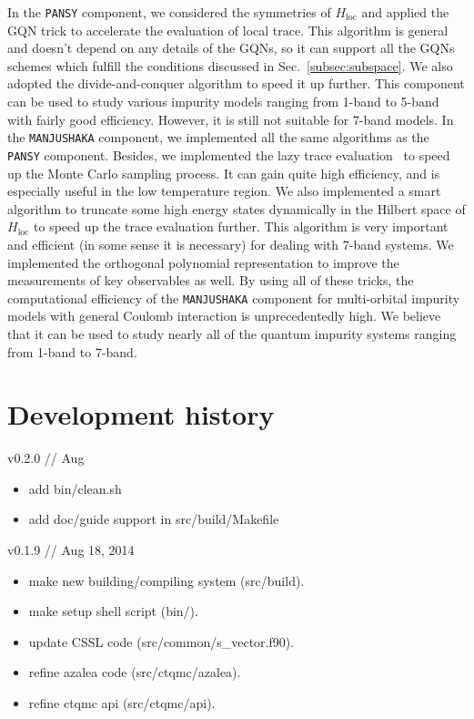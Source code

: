 In the \texttt{PANSY} component, we considered the symmetries of $H_{\text{loc}}$ and applied the GQN trick to accelerate the evaluation of local trace. This algorithm is general and doesn't depend on any details of the GQNs, so it can support all the GQNs schemes which fulfill the conditions discussed in Sec.~\ref{subsec:subspace}. We also adopted the divide-and-conquer algorithm to speed it up further. This component can be used to study various impurity models ranging from 1-band to 5-band with fairly good efficiency. However, it is still not suitable for 7-band models. In the \texttt{MANJUSHAKA} component, we implemented all the same algorithms as the \texttt{PANSY} component. Besides, we implemented the lazy trace evaluation~\cite{arXiv:1403.7214} to speed up the Monte Carlo sampling process. It can gain quite high efficiency, and is especially useful in the low temperature region. We also implemented a smart algorithm to truncate some high energy states dynamically in the Hilbert space of $H_{\text{loc}}$ to speed up the trace evaluation further. This algorithm is very important and efficient (in some sense it is necessary) for dealing with 7-band systems. We implemented the orthogonal polynomial representation to improve the measurements of key observables as well. By using all of these tricks, the computational efficiency of the \texttt{MANJUSHAKA} component for multi-orbital impurity models with general Coulomb interaction is unprecedentedly high. We believe that it can be used to study nearly all of the quantum impurity systems ranging from 1-band to 7-band.

\section{Development history}

v0.2.0 // Aug

\begin{itemize}
\item add bin/clean.sh
\item add doc/guide support in src/build/Makefile
\end{itemize}

v0.1.9 // Aug 18, 2014

\begin{itemize}
\item make new building/compiling system (src/build).
\item make setup shell script (bin/).
\item update CSSL code (src/common/s\_vector.f90).
\item refine azalea code (src/ctqmc/azalea).
\item refine ctqmc api (src/ctqmc/api).
\end{itemize}


